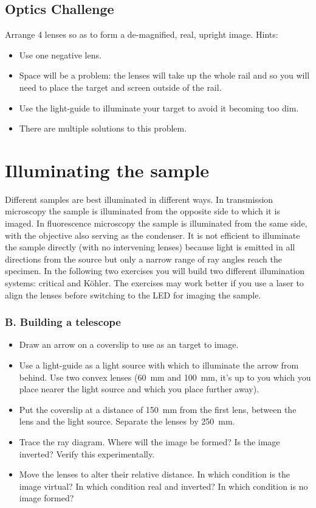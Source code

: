\documentclass[a4paper]{report}
\begin{document}
\subsection{Optics Challenge}
Arrange 4 lenses so as to form a de-magnified, real, upright
image. Hints: 
\begin{itemize}
\item Use one negative lens.
\item Space will be a problem: the lenses will take up the whole rail
  and so you will need to place the target and screen outside of the
  rail. 
\item Use the light-guide to illuminate your target to avoid it
  becoming too dim. 
\item There are multiple solutions to this problem.
\end{itemize}


\clearpage
\section{Illuminating the sample}
Different samples are best illuminated in different ways.
In transmission microscopy the sample is illuminated from the opposite side to which it is imaged. 
In fluorescence microscopy the sample is illuminated from the same side, with the objective also serving as the condenser. 
It is not efficient to illuminate the sample directly (with no intervening lenses) because light is emitted in all directions from the source but only a narrow range of ray angles reach the specimen. 
In the following two exercises you will build two different illumination systems: critical and K\"{o}hler. 
The exercises may work better if you use a laser to align the lenses before switching to the LED for imaging the sample. 


\subsubsection{B. Building a telescope}
\begin{itemize}
\item Draw an arrow on a coverslip to use as an target to image. 
\item Use a light-guide as a light source with which to illuminate the arrow from behind. 
Use two convex lenses (60~mm and 100~mm, it's up to you which you place nearer the light source and which you place further away). 
\item Put the coverslip at a distance of 150~mm from the first lens, between the lens and the light source. 
Separate the lenses by 250~mm. 
\item Trace the ray diagram. Where will the image be formed? Is the image inverted?  Verify this experimentally. 
\item Move the lenses to alter their relative distance. In which condition is the image virtual? In
which condition real and inverted? In which condition is no image formed?
\end{itemize}
\end{document}
